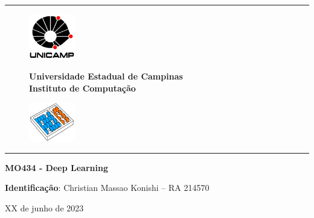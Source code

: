 \documentclass[11pt,letter]{article}
\begin{document}
	
	\sloppy
	
	\thispagestyle{empty}
	
	\begin{center}
		\rule{\textwidth}{1pt}
	\end{center}
	
	\vspace*{-0.2cm}
	
	\begin{figure}[!ht]
		\begin{minipage}[b]{2.3cm}
			\centering
			\hspace*{0.4cm}
			\includegraphics[width=2.0cm]{./fig/logo-unicamp-name-line-blk-red-0480-eps-converted-to.pdf}
		\end{minipage}
		\begin{minipage}[b]{11.1cm}
			\centering
			\hspace*{0.4cm}
			{\large \bf Universidade Estadual de Campinas} \\[0.2cm]
			{\large \bf Instituto de Computação}
		\end{minipage}
		\begin{minipage}[b]{2.3cm}
			\centering
			\hspace*{0.4cm}
			\includegraphics[width=2.0cm]{./fig/logo-ic-unicamp-slant-line-wht-sky-ora-0480-eps-converted-to.pdf}
		\end{minipage}
	\end{figure}
	
	\vspace*{-0.2cm}
	
	\begin{center}
		\rule{\textwidth}{1pt}
	\end{center}
	
	\vspace*{0.1cm}
	
	\begin{spacing}{1.2}
		\begin{center}
			{\Large \bf MO434 - Deep Learning}
			\\ [0.5cm]
		\end{center}
	\end{spacing}
	
	\begin{spacing}{1.3}
		\setcounter{page}{1}
		\noindent \textbf{Identificação}: Christian Massao Konishi -- RA 214570\\
		
		\vspace*{\fill}
		
		\centerline{XX de junho de 2023}
		
		\newpage
		
		
		
		\printbibliography 
	\end{spacing}
	
	\vfill
	
\end{document}
